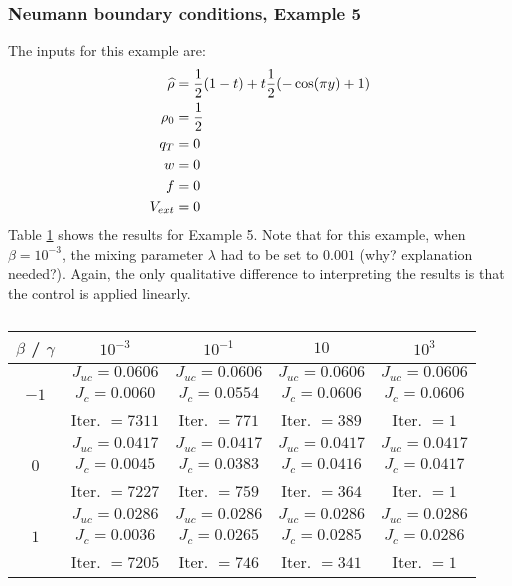 \subsubsection{Neumann boundary conditions, Example 5}
The inputs for this example are:
\begin{align*}
\widehat \rho &= \frac{1}{2}(1-t) + t\frac{1}{2}(-\cos(\pi y) + 1)\\
\rho_{0} &= \frac{1}{2}\\
q_{T} &= 0\\
{w} &= 0\\
f &=0\\
V_{ext} &=0
\end{align*}
Table \ref{TabNFlowEx5} shows the results for Example 5. Note that for this example, when $\beta = 10^{-3}$, the mixing parameter $\lambda$ had to be set to $0.001$ (why? explanation needed?).
Again, the only qualitative difference to interpreting the results is that the control is applied linearly.
\begin{table}[h]
	\begin{tabular}{ ||c|| c | c |c | c ||}
		\hline
		$\beta$ / $\gamma$ & $10^{-3}$  & $10^{-1}$  & $10$ & $10^3$ \\ 
		\hline 
		& $J_{uc} = 0.0606$ & $J_{uc} = 0.0606$  & $J_{uc} = 0.0606$ & $J_{uc} = 0.0606$\\ 
		$-1$ & $J_c = 0.0060$ & $J_c = 0.0554$ & $J_c = 0.0606$ & $J_c = 0.0606$\\ 
		& Iter. $= 7311$ & Iter. $= 771$  & Iter. $= 389$ & Iter. $= 1$\\ 
		\hline
		& $J_{uc} = 0.0417$ & $J_{uc} = 0.0417$   & $J_{uc} = 0.0417$& $J_{uc} = 0.0417$\\
		$0$  & $J_c = 0.0045$ & $J_c = 0.0383$  & $J_c = 0.0416$ & $J_c = 0.0417$\\ 
		& Iter. $= 7227$ & Iter. $= 759$  & Iter. $= 364$ & Iter. $= 1$\\ 
		\hline
		& $J_{uc} = 0.0286$ & $J_{uc} = 0.0286$  & $J_{uc} = 0.0286$ & $J_{uc} = 0.0286$\\
		$1$  & $J_c = 0.0036$ & $J_c = 0.0265$  & $J_c = 0.0285$ & $J_c = 0.0286$\\ 
		& Iter. $= 7205$ & Iter. $= 746$  & Iter. $= 341$ & Iter. $= 1$\\ 
		\hline 
	\end{tabular}
	\caption{}
	\label{TabNFlowEx5}
\end{table}
